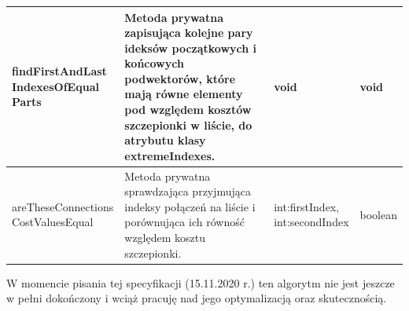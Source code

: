 \documentclass[a4paper]{article}
\begin{document}
{\begin{tabular}{| p{3.5cm} | p{5cm} | p{3cm} | m{2cm} |}
\parbox[t]{3cm}{findFirstAndLast\\IndexesOfEqual\\Parts} & 
\parbox[t]{5cm}{Metoda prywatna zapisująca kolejne pary ideksów początkowych i końcowych podwektorów, które mają równe elementy pod względem kosztów szczepionki w liście, do atrybutu klasy extremeIndexes.} & 
\parbox[t]{3cm}{void} &
\parbox[t]{2cm}{void} \\ \hline

\parbox[t]{3cm}{areTheseConnections\\CostValuesEqual} & 
\parbox[t]{5cm}{Metoda prywatna sprawdzająca przyjmująca indeksy połączeń na liście i porównująca ich równość względem kosztu szczepionki.} & 
\parbox[t]{3cm}{int:firstIndex,\\int:secondIndex} &
\parbox[t]{2cm}{boolean} \\ \hline
\end{tabular}
}
\begin{tcolorbox}
W momencie pisania tej specyfikacji (15.11.2020 r.) ten algorytm nie jest jeszcze w pełni dokończony i wciąż pracuję nad jego optymalizacją oraz skutecznością.
\end{tcolorbox}
\newpage 
\end{document}
